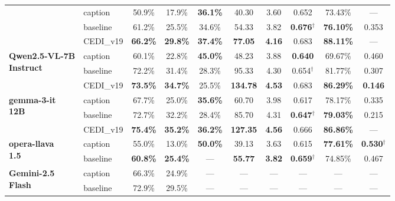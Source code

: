 \begin{table}[t]
\begin{tabular}{@{}l|l|cccccccc@{}}
  & caption  & 50.9\% & 17.9\% & \textbf{36.1\%} & 40.30 & 3.60 & 0.652 & 73.43\% & --- \\
  & baseline & 61.2\% & 25.5\% & 34.6\% & 54.33 & 3.82 & \textbf{0.676}$^\dagger$ & \textbf{76.10\%} & 0.353 \\
\rowcolor[HTML]{E6F2FF}
  \multicolumn{1}{l}{\cellcolor[HTML]{E6F2FF}} & CEDI\_v19 & \textbf{66.2\%} & \textbf{29.8\%} & \textbf{37.4\%} & \textbf{77.05} & \textbf{4.16} & 0.683 & \textbf{88.11\%} & --- \\
\midrule
\multirow{3}{*}{\parbox{2.5cm}{\centering\textbf{Qwen2.5-VL-7B}\\ \textbf{Instruct}}}
  & caption  & 60.1\% & 22.8\% & \textbf{45.0\%} & 48.23 & 3.88 & \textbf{0.640} & 69.67\% & 0.460 \\
  & baseline & 72.2\% & 31.4\% & 28.3\% & 95.33 & 4.30 & 0.654$^\dagger$ & 81.77\% & 0.307 \\
\rowcolor[HTML]{E6F2FF}
  \multicolumn{1}{l}{\cellcolor[HTML]{E6F2FF}} & CEDI\_v19 & \textbf{73.5\%} & \textbf{34.7\%} & 25.5\% & \textbf{134.78} & \textbf{4.53} & 0.683 & \textbf{86.29\%} & \textbf{0.146} \\
\midrule
\multirow{3}{*}{\parbox{2.5cm}{\centering\textbf{gemma-3-it}\\ \textbf{12B}}}
  & caption  & 67.7\% & 25.0\% & \textbf{35.6\%} & 60.70 & 3.98 & 0.617 & 78.17\% & 0.335 \\
  & baseline & 72.7\% & 32.2\% & 28.4\% & 85.70 & 4.31 & \textbf{0.647}$^\dagger$ & \textbf{79.03\%} & 0.215 \\
\rowcolor[HTML]{E6F2FF}
  \multicolumn{1}{l}{\cellcolor[HTML]{E6F2FF}} & CEDI\_v19 & \textbf{75.4\%} & \textbf{35.2\%} & \textbf{36.2\%} & \textbf{127.35} & \textbf{4.56} & 0.666 & \textbf{86.86\%} & --- \\
\midrule
\multirow{2}{*}{\parbox{2.5cm}{\centering\textbf{opera-llava}\\ \textbf{1.5}}}
  & caption  & 55.0\% & 13.0\% & \textbf{50.0\%} & 39.13 & 3.63 & 0.615 & \textbf{77.61\%} & \textbf{0.530}$^\dagger$ \\
  & baseline & \textbf{60.8\%} & \textbf{25.4\%} & --- & \textbf{55.77} & \textbf{3.82} & \textbf{0.659}$^\dagger$ & 74.85\% & 0.467 \\
\midrule
\multirow{3}{*}{\parbox{2.5cm}{\centering\textbf{Gemini-2.5}\\ \textbf{Flash}}}
  & caption    & 66.3\% & 24.9\% & --- & --- & --- & --- & --- & --- \\
  & baseline   & 72.9\% & 29.5\% & --- & --- & --- & --- & --- & --- \\

\end{tabular}
\end{table}
